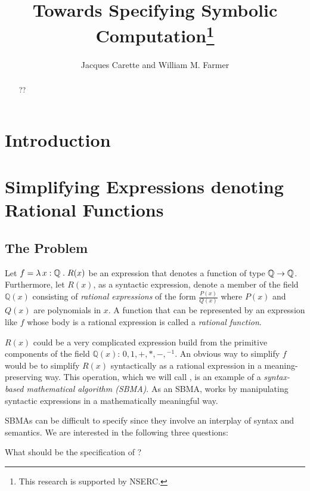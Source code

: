 \documentclass[fleqn]{llncs}
\title{Towards Specifying Symbolic Computation\thanks{This research is
    supported by NSERC.}}
\author{Jacques Carette and William M. Farmer}
\institute{%
Computing and Software, McMaster University, Canada\\
\url{http://www.cas.mcmaster.ca/~carette}\\
\url{http://imps.mcmaster.ca/wmfarmer}\\[1.5ex]
}
\begin{document}
\maketitle

\begin{abstract}
??
\end{abstract}

\iffalse 

\textbf{Keywords:} ??

\fi

\section{Introduction}

\section{Simplifying Expressions denoting Rational Functions}

\subsection{The Problem}

Let $f = \lambda\, x : \mathbb{Q} \mathrel. R(x)$ be an expression that
denotes a function of type $\mathbb{Q} \rightarrow \mathbb{Q}$.
Furthermore, let $R(x)$, as a syntactic expression, denote a member of
the field $\mathbb{Q}(x)$ consisting of \emph{rational expressions} of
the form $\frac{P(x)}{Q(x)}$ where $P(x)$ and $Q(x)$ are polynomials
in $x$.  A function that can be represented by an expression like $f$
whose body is a rational expression is called a \emph{rational
  function}.

$R(x)$ could be a very complicated expression build from the primitive
components of the field $\mathbb{Q}(x)$: $0,1,+,*,-,\phantom{}^{-1}$.
An obvious way to simplify $f$ would be to simplify $R(x)$
syntactically as a rational expression in a meaning-preserving way.
This operation, which we will call , is an example
of a \emph{syntax-based mathematical algorithm (SBMA)}.  As an SBMA,
 works by manipulating syntactic expressions in a
mathematically meaningful way.

SBMAs can be difficult to specify since they involve an interplay of
syntax and semantics.  We are interested in the following three
questions:

\be

  \item What should be the specification of ?
\end{document}
